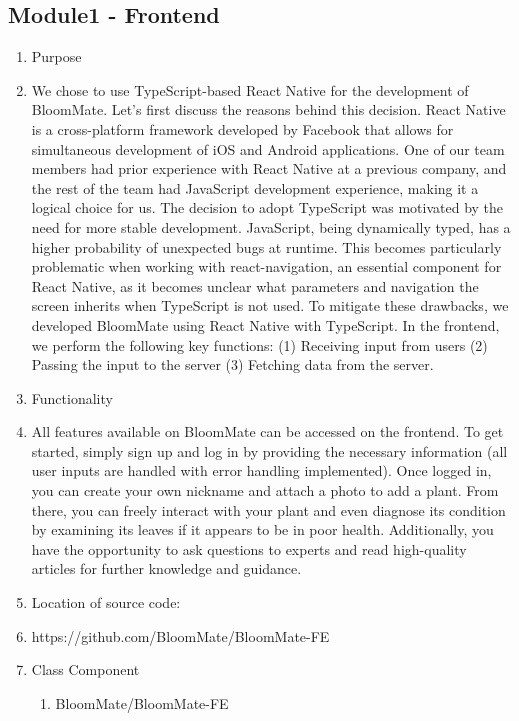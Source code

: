 \documentclass[conference, a4paper]{IEEEtran}
\begin{document}
\subsection{Module1 -  Frontend}
\begin{enumerate}
    \item Purpose
    \item[] We chose to use TypeScript-based React Native for the development of BloomMate. Let's first discuss the reasons behind this decision. React Native is a cross-platform framework developed by Facebook that allows for simultaneous development of iOS and Android applications. One of our team members had prior experience with React Native at a previous company, and the rest of the team had JavaScript development experience, making it a logical choice for us. The decision to adopt TypeScript was motivated by the need for more stable development. JavaScript, being dynamically typed, has a higher probability of unexpected bugs at runtime. This becomes particularly problematic when working with react-navigation, an essential component for React Native, as it becomes unclear what parameters and navigation the screen inherits when TypeScript is not used. To mitigate these drawbacks, we developed BloomMate using React Native with TypeScript. In the frontend, we perform the following key functions: (1) Receiving input from users (2) Passing the input to the server (3) Fetching data from the server.\\
    \item Functionality
    \item[] All features available on BloomMate can be accessed on the frontend. To get started, simply sign up and log in by providing the necessary information (all user inputs are handled with error handling implemented). Once logged in, you can create your own nickname and attach a photo to add a plant. From there, you can freely interact with your plant and even diagnose its condition by examining its leaves if it appears to be in poor health. Additionally, you have the opportunity to ask questions to experts and read high-quality articles for further knowledge and guidance.\\
    \item Location of source code:
    \item[] https://github.com/BloomMate/BloomMate-FE\\
    \item Class Component
    \begin{enumerate}
        \item BloomMate/BloomMate-FE

\end{enumerate}
\end{enumerate}
\end{document}
